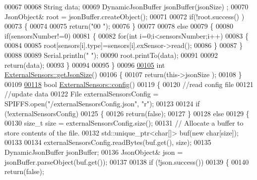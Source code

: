 \begin{DoxyCode}
00067 
00068     String data;
00069     DynamicJsonBuffer  jsonBuffer(jsonSize) ;
00070     JsonObject& root = jsonBuffer.createObject();
00071 
00072     \textcolor{keywordflow}{if}(!root.success() )
00073     \{
00074 
00075      \textcolor{keywordflow}{return}(\textcolor{stringliteral}{"00 "});
00076     \}
00077 
00078     \textcolor{keywordflow}{else}
00079     \{
00080         \textcolor{keywordflow}{if}(sensorsNumber!=0)
00081         \{
00082             \textcolor{keywordflow}{for}(\textcolor{keywordtype}{int} i=0;i<sensorsNumber;i++)
00083             \{
00084             
00085                 root[sensors[i].type]=sensors[i].exSensor->read();      
00086             \}
00087         \}   
00088         
00089         Serial.println(\textcolor{stringliteral}{" "});
00090         root.printTo(data);
00091     
00092         \textcolor{keywordflow}{return}(data);
00093     \}
00094 
00095 \}
00096 
\hyperlink{class_external_sensors_a8e3a93efa8f5a0477f300e26084b6625}{00105} \textcolor{keywordtype}{int} \hyperlink{class_external_sensors_a8e3a93efa8f5a0477f300e26084b6625}{ExternalSensors::getJsonSize}()
00106 \{
00107     \textcolor{keywordflow}{return}(this->jsonSize );
00108 \}
00109 
\hyperlink{class_external_sensors_a862a4bd11346b37270d0244c2adabe5a}{00118} \textcolor{keywordtype}{bool} \hyperlink{class_external_sensors_a862a4bd11346b37270d0244c2adabe5a}{ExternalSensors::config}()
00119 \{
00120     \textcolor{comment}{//read config file}
00121     \textcolor{comment}{//update data}
00122     File externalSensorsConfig = SPIFFS.open(\textcolor{stringliteral}{"/externalSensorsConfig.json"}, \textcolor{stringliteral}{"r"});
00123 
00124     \textcolor{keywordflow}{if} (!externalSensorsConfig) 
00125     \{
00126         \textcolor{keywordflow}{return}(\textcolor{keyword}{false});
00127     \}
00128     \textcolor{keywordflow}{else}
00129     \{
00130         \textcolor{keywordtype}{size\_t} size = externalSensorsConfig.size();
00131         \textcolor{comment}{// Allocate a buffer to store contents of the file.}
00132         std::unique\_ptr<char[]> buf(\textcolor{keyword}{new} \textcolor{keywordtype}{char}[size]);
00133 
00134         externalSensorsConfig.readBytes(buf.get(), size);
00135         DynamicJsonBuffer jsonBuffer;
00136         JsonObject& json = jsonBuffer.parseObject(buf.get());
00137 
00138         \textcolor{keywordflow}{if} (!json.success()) 
00139         \{
00140               \textcolor{keywordflow}{return}(\textcolor{keyword}{false});

\end{DoxyCode}
